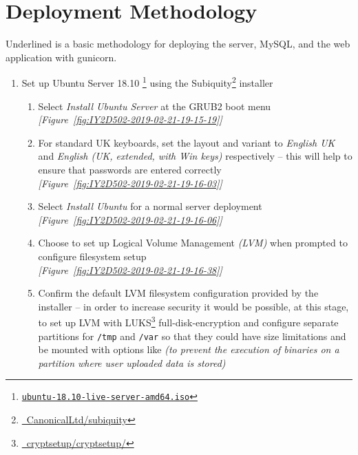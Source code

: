\section{Deployment Methodology}
Underlined is a basic methodology for deploying the server, MySQL, and the web application with gunicorn.

\begin{enumerate}[leftmargin=0em,label=\protect\listlabelcircle{\arabic*}]
  \item Set up Ubuntu Server 18.10 \footnote{\href{http://releases.ubuntu.com/18.10/ubuntu-18.10-live-server-amd64.iso}{\texttt{ubuntu-18.10-live-server-amd64.iso}}} using the Subiquity\footnote{\href{https://github.com/CanonicalLtd/subiquity}{\faGithub\ CanonicalLtd/subiquity}} installer
    \begin{enumerate}[label=\Roman*~\textcolor{light-gray}{|}]
      \item Select \textit{Install Ubuntu Server} at the GRUB2 boot menu\\
      \textcolor{deep-gray}{\textit{[Figure~\ref{fig:IY2D502-2019-02-21-19-15-19}]}}
      \item For standard UK keyboards, set the layout and variant to \textit{English {UK}} and \textit{English (UK, extended, with Win keys)} respectively -- this will help to ensure that passwords are entered correctly\\
      \textcolor{deep-gray}{\textit{[Figure~\ref{fig:IY2D502-2019-02-21-19-16-03}]}}
      \item Select \textit{Install Ubuntu} for a normal server deployment\\
      \textcolor{deep-gray}{\textit{[Figure~\ref{fig:IY2D502-2019-02-21-19-16-06}]}}
      \item Choose to set up Logical Volume Management \textit{(LVM)} when prompted to configure filesystem setup\\
      \textcolor{deep-gray}{\textit{[Figure~\ref{fig:IY2D502-2019-02-21-19-16-38}]}}
      \item Confirm the default LVM filesystem configuration provided by the installer -- in order to increase security it would be possible, at this stage, to set up LVM with LUKS\footnote{\href{https://gitlab.com/cryptsetup/cryptsetup/}{\faGitlab\ cryptsetup/cryptsetup/}} full-disk-encryption and configure separate partitions for \texttt{/tmp} and \texttt{/var} so that they could have size limitations and be mounted with options like  \textit{(to prevent the execution of binaries on a partition where user uploaded data is stored)}\\

\end{enumerate}
\end{enumerate}
